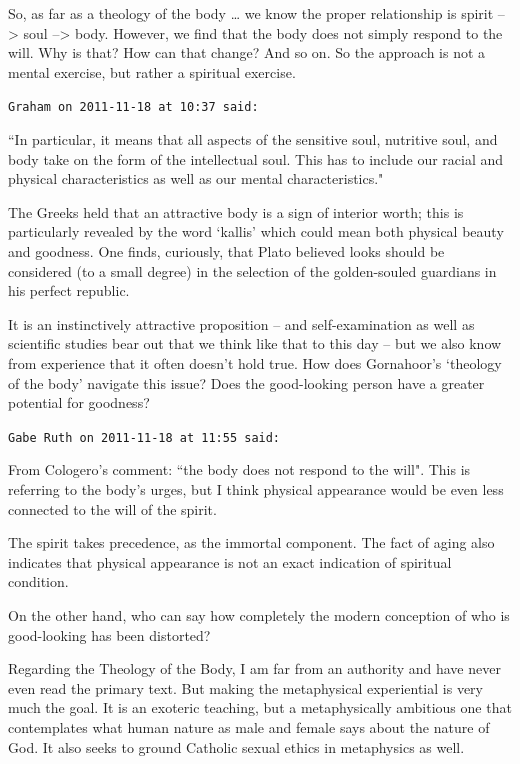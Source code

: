 \begin{footnotesize}
\begin{sffamily}
So, as far as a theology of the body … we know the proper relationship is spirit –{\textgreater} soul –{\textgreater} body. However, we find that the body does not simply respond to the will. Why is that? How can that change? And so on. So the approach is not a mental exercise, but rather a spiritual exercise.


\hfill

\texttt{Graham on 2011-11-18 at 10:37 said: }

``In particular, it means that all aspects of the sensitive soul, nutritive soul, and body take on the form of the intellectual soul. This has to include our racial and physical characteristics as well as our mental characteristics."

The Greeks held that an attractive body is a sign of interior worth; this is particularly revealed by the word `kallis' which could mean both physical beauty and goodness. One finds, curiously, that Plato believed looks should be considered (to a small degree) in the selection of the golden-souled guardians in his perfect republic.

It is an instinctively attractive proposition – and self-examination as well as scientific studies bear out that we think like that to this day – but we also know from experience that it often doesn't hold true. How does Gornahoor's `theology of the body' navigate this issue? Does the good-looking person have a greater potential for goodness?


\hfill

\texttt{Gabe Ruth on 2011-11-18 at 11:55 said: }

From Cologero's comment: ``the body does not respond to the will". This is referring to the body's urges, but I think physical appearance would be even less connected to the will of the spirit.

The spirit takes precedence, as the immortal component. The fact of aging also indicates that physical appearance is not an exact indication of spiritual condition. 

On the other hand, who can say how completely the modern conception of who is good-looking has been distorted?

Regarding the Theology of the Body, I am far from an authority and have never even read the primary text. But making the metaphysical experiential is very much the goal. It is an exoteric teaching, but a metaphysically ambitious one that contemplates what human nature as male and female says about the nature of God. It also seeks to ground Catholic sexual ethics in metaphysics as well.


\end{sffamily}
\end{footnotesize}
